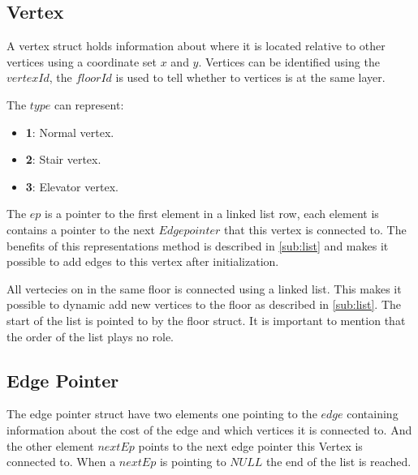 \begin{minipage}{\linewidth}
\subsection{Vertex}\label{data_struct:vertex}
A vertex struct holds information about where it is located relative to other vertices using a coordinate set $x$ and $y$. Vertices can be identified using the $vertexId$, the $floorId$ is used to tell whether to vertices is at the same layer.

 The $type$ can represent:
\begin{itemize}[noitemsep]
	\item \textbf{1}: Normal vertex.
	\item \textbf{2}: Stair vertex.
	\item \textbf{3}: Elevator vertex.
\end{itemize}

The $ep$ is a pointer to the first element in a linked list row, each element is contains a pointer to the next $Edge pointer$ that this vertex is connected to. The benefits of this representations method is described in \cref{sub:list} and makes it possible to add edges to this vertex after initialization.


All vertecies on in the same floor is connected using a linked list. This makes it possible to dynamic add new vertices to the floor as described in \cref{sub:list}. The start of the list is pointed to by the floor struct. It is important to mention that the order of the list plays no role.   


 \label{vertex_struct}
\end{minipage}

\begin{minipage}{\linewidth}
\subsection{Edge Pointer}

The edge pointer struct have two elements one pointing to the $edge$ containing information about the cost of the edge and which vertices it is connected to. And the other element $nextEp$ points to the next edge pointer this Vertex is connected to. When a $nextEp$ is pointing to $NULL$ the end of the list is reached.
 \label{ep_struct}

\end{minipage}


